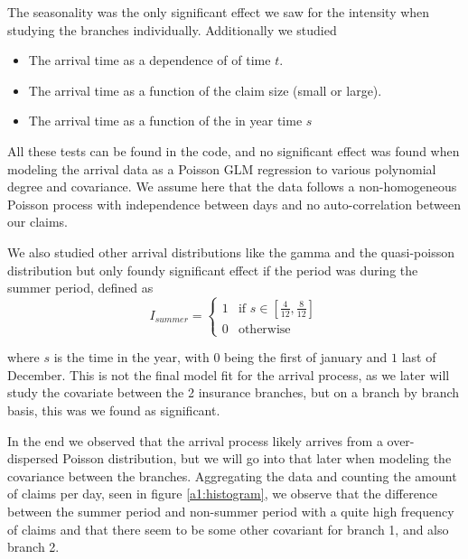 \documentclass[11pt]{article}
\begin{document}
The seasonality was the only significant effect we saw for the intensity when studying the branches individually.
Additionally we studied
\begin{itemize}
    \item The arrival time as a dependence of of time $t$.
    \item The arrival time as a function of the claim size (small or large).
    \item The arrival time as a function of the in year time $s$
\end{itemize}

All these tests can be found in the code, and no significant effect was found when modeling the arrival data as a Poisson GLM regression to various polynomial degree and covariance.
We assume here that the data follows a non-homogeneous Poisson process with independence between days and no auto-correlation between our claims.

We also studied other arrival distributions like the gamma and the quasi-poisson distribution but only foundy significant effect if the period was during the summer period, defined as 
\begin{equation}
    I_{summer} = \begin{cases}
      1 & \text{if } s\in{[\frac{4}{12},\frac{8}{12}]}\\
      0 & \text{otherwise}
    \end{cases}  
    \label{eq:summer}
\end{equation}

where $s$ is the time in the year, with $0$ being the first of january and $1$ last of December. 
This is not the final model fit for the arrival process, as we later will study the covariate between the 2 insurance branches, but on a branch by branch basis, this was we found as significant.

In the end we observed that the arrival process likely arrives from a over-dispersed Poisson distribution, but we will go into that later when modeling the covariance between the branches.
Aggregating the data and counting the amount of claims per day, seen in figure \ref{a1:histogram}, we observe that the difference between the summer period and non-summer period with a quite high frequency of claims and that there seem to be some other covariant for branch 1, and also branch 2.
\end{document}
